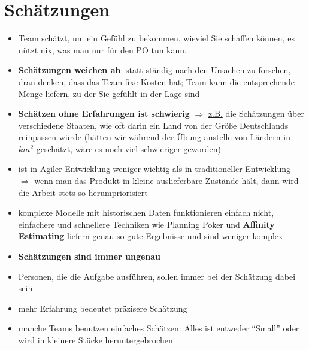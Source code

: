 \section{Schätzungen}
\begin{itemize}
  \item Team schätzt, um ein Gefühl zu bekommen, wieviel Sie schaffen können, es nützt nix, was man
    nur für den PO tun kann.
  \item \textbf{Schätzungen weichen ab}: statt ständig nach den Ursachen zu forschen, dran denken, dass das
    Team fixe Kosten hat; Team kann die entsprechende Menge liefern, zu der Sie gefühlt in der
    Lage sind
  \item \textbf{Schätzen ohne Erfahrungen ist schwierig} $\Rightarrow$  \uline{z.B.} die Schätzungen
    über verschiedene Staaten, wie oft darin ein Land von der Größe Deutschlands reinpassen
    würde (hätten wir während der Übung anstelle von Ländern in $km^2$ geschätzt, wäre es noch
    viel schwieriger geworden)
  \item ist in Agiler Entwicklung weniger wichtig als in traditioneller Entwicklung $\Rightarrow$
  wenn man das Produkt in kleine auslieferbare Zustände hält, dann wird die Arbeit stets so
  herumpriorisiert
  \item komplexe Modelle mit historischen Daten funktionieren einfach nicht, einfachere und
    schnellere Techniken wie Planning Poker und \textbf{Affinity Estimating} liefern genau
    so gute Ergebnisse und sind weniger komplex
  \item \textbf{Schätzungen sind immer ungenau}
  \item Personen, die die Aufgabe ausführen, sollen immer bei der Schätzung dabei sein
  \item mehr Erfahrung bedeutet präzisere Schätzung
  \item manche Teams benutzen einfaches Schätzen: Alles ist entweder \enquote{Small} oder wird in
    kleinere Stücke heruntergebrochen
\end{itemize}


